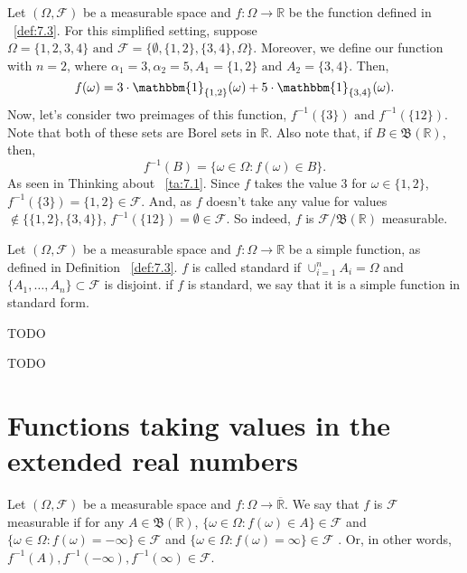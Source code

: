 \begin{myexample}
    \label{myex:7.1}
    Let $(\Omega, \mathcal{F})$ be a measurable space and $f: \Omega \to \mathbb{R}$ be the function defined
    in ~\ref{def:7.3}. For this simplified setting, suppose $\Omega = \{1,2,3,4\} \text{ and }\mathcal{F} =
    \{\emptyset, \{1,2\} , \{3,4\} , \Omega\} $. Moreover, we define our function with $n =2$, where
     $\alpha_1 = 3, \alpha_2 = 5, A_1 = \{1,2\} \text{ and } A_2 = \{3,4\} $. Then,
     \[
         f(\omega) = 3\cdot \mathbbm{1}_{\{1,2\}}(\omega) + 5\cdot \mathbbm{1}_{\{3,4\}}(\omega)
     .\] 
     Now, let's consider two preimages of this function, $f^{-1}(\{3\} ) \text{ and } f^{-1}(\{12\} )$. Note that
     both of these sets are Borel sets in $\mathbb{R}$. Also note that, if $B \in  \mathfrak{B}(\mathbb{R})$, then,
     \[
     f^{-1}(B) = \{\omega \in \Omega: f(\omega) \in B\} 
     .\] 
     As seen in Thinking about ~\ref{ta:7.1}. Since $f$ takes the value $3$ for $\omega \in \{1,2\} $,
     $f^{-1}(\{3\} ) = \{1,2\} \in \mathcal{F} $. And, as $f$ doesn't take any value for values
     $\not\in \{\{1,2\} , \{3,4\} \} $, $f^{-1}(\{12\} ) = \emptyset \in \mathcal{F}$. So indeed, $f$ is
     $\mathcal{F}/\mathfrak{B}(\mathbb{R})$ measurable.
\end{myexample}

\begin{definition}
    \label{def:7.4}
    Let $(\Omega, \mathcal{F})$ be a measurable space and $f: \Omega \to \mathbb{R}$ be a simple function, as defined in
    Definition ~\ref{def:7.3}. $f$ is called standard if $\cup_{i=1}^{n}A_i = \Omega$ and $\{A_1, \ldots, A_n\} \subset \mathcal{F}$
    is disjoint. if $f$ is standard, we say that it is a simple function in standard form.
\end{definition}

\begin{proposition}[7.7]
    \label{prop:7.7}
    TODO
    
\end{proposition}

\begin{proposition}[7.8]
    \label{prop:7.8}
    TODO
    
\end{proposition}

\section{Functions taking values in the extended real numbers}%
\label{sec:Functions taking values in the extended real numbers}
\begin{definition}
    \label{def:7.5}
    Let $(\Omega, \mathcal{F})$ be a measurable space and $f: \Omega \to \overline{\mathbb{R}}$. We say that
    $f$ is $\mathcal{F}$ measurable if for any $A \in \mathfrak{B}(\mathbb{R})$, $\{\omega \in  \Omega: f(\omega) \in A\} \in \mathcal{F}$ 
    and $\{\omega \in  \Omega: f(\omega) = -\infty\} \in \mathcal{F}$ and $\{\omega \in  \Omega: f(\omega) = \infty\} \in \mathcal{F}$ .
    Or, in other words, $f^{-1}(A), f^{-1}(-\infty), f^{-1}(\infty) \in \mathcal{F}$.
\end{definition}

